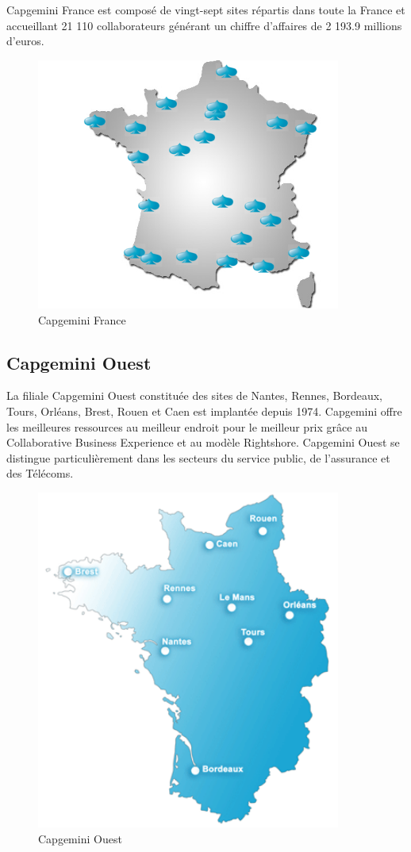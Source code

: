 Capgemini France est composé de vingt-sept sites répartis dans toute la France et accueillant 21 110 collaborateurs générant un chiffre d'affaires de 2 193.9 millions d'euros.

\begin{figure}[!h]
    \centering
        \includegraphics[width=10cm]{img/capgeminiFrance.png}
        \caption{Capgemini France}
        \label{fig:capgeminiFrance}
\end{figure}

\subsection{Capgemini Ouest}

 La filiale Capgemini Ouest constituée des sites de Nantes, Rennes, Bordeaux, Tours, Orléans, Brest, Rouen et Caen est implantée depuis 1974. Capgemini offre les meilleures ressources au meilleur endroit pour le meilleur prix grâce au Collaborative Business Experience et au modèle Rightshore. Capgemini Ouest se distingue particulièrement dans les secteurs du service public, de l'assurance et des Télécoms.
 
\begin{figure}[!h]
    \centering
        \includegraphics[width=10cm]{img/capgeminiOuest.png}
        \caption{Capgemini Ouest}
        \label{fig:capgeminiOuest}
\end{figure}

